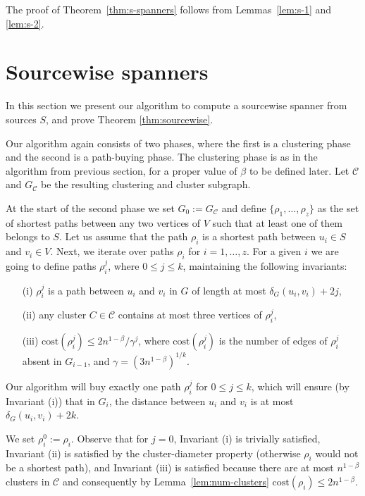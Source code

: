 \documentclass[a4paper,11pt]{article}
\theoremstyle{definition}
\newcommand{\dist}{\delta}
\newcommand{\cost}{\mathrm{cost}}
\newcommand{\cC}{\mathcal{C}}
\begin{document}
The proof of Theorem~\ref{thm:s-spanners} follows from Lemmas~\ref{lem:s-1} and \ref{lem:s-2}.



\section{Sourcewise spanners}
\label{section-sourcewise}

In this section we present our algorithm to compute a sourcewise spanner from sources $S$, and prove Theorem \ref{thm:sourcewise}. 

Our algorithm again consists of two phases, where the first 
is a clustering phase and the second is a path-buying phase.
The clustering phase is as in the algorithm from previous section, for a proper value of $\beta$ to be defined later. Let $\cC$ and $G_\cC$ be the resulting clustering and cluster subgraph. 


At the start of the second phase we set $G_0:=G_\cC$
and define $\{\rho_1, \ldots, \rho_z\}$ as the 
set of shortest paths between any two vertices of $V$
such that at least one of them belongs to $S$.
Let us assume that the path $\rho_i$ is a shortest path 
between $u_i \in S$ and $v_i \in V$.
Next, we iterate over paths $\rho_i$ for $i=1,\ldots,z$.
For a given $i$ we are going to define paths $\rho_i^j$, where $0 \le j \le k$,
maintaining the following invariants:\smallskip

\begin{itemize}
  \item[(i)] $\rho_i^j$ is a path between $u_i$ and $v_i$ in $G$ of length at most $\dist_G(u_i,v_i)+2j$,
  \item[(ii)] any cluster $C \in \cC$ contains at most three vertices of $\rho_i^j$,
  \item[(iii)] $\cost(\rho_i^j) \le 2n^{1-\beta} / \gamma^j$, where $\cost(\rho_i^j)$ is the number of edges of $\rho_i^j$ absent in $G_{i-1}$,
and $\gamma=(3n^{1-\beta})^{1/k}$.
\end{itemize}

\smallskip\noindent Our algorithm will buy exactly one path $\rho_i^j$ for $0 \le j \le k$, which will ensure 
(by Invariant (i)) that in $G_{i}$, the distance between $u_i$ and $v_i$ is at most $\dist_G(u_i,v_i)+2k$.

We set $\rho_i^0 := \rho_i$. 
Observe that for $j=0$, Invariant (i) is trivially satisfied,
Invariant (ii) is satisfied by the cluster-diameter property  
(otherwise $\rho_i$ would not be a shortest path),
and Invariant (iii) is satisfied because there are at most $n^{1-\beta}$ clusters in $\cC$
and consequently by Lemma~\ref{lem:num-clusters} $\cost(\rho_i) \le 2n^{1-\beta}$. 
\end{document}
